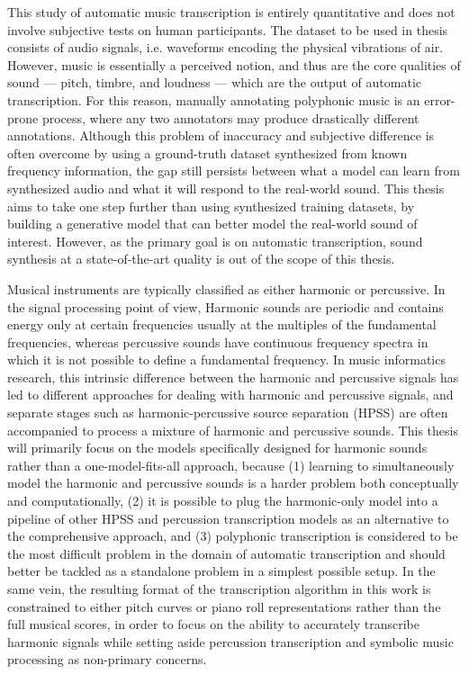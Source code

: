 This study of automatic music transcription is entirely quantitative and does not involve subjective tests on human participants.
The dataset to be used in thesis consists of audio signals, i.e. waveforms encoding the physical vibrations of air.
However, music is essentially a perceived notion, and thus are the core qualities of sound --- pitch, timbre, and loudness --- which are the output of automatic transcription.
For this reason, manually annotating polyphonic music is an error-prone process, where any two annotators may produce drastically different annotations.
Although this problem of inaccuracy and subjective difference is often overcome by using a ground-truth dataset synthesized from known frequency information, the gap still persists between what a model can learn from synthesized audio and what it will respond to the real-world sound.
This thesis aims to take one step further than using synthesized training datasets, by building a generative model that can better model the real-world sound of interest.
However, as the primary goal is on automatic transcription, sound synthesis at a state-of-the-art quality is out of the scope of this thesis.


Musical instruments are typically classified as either harmonic or percussive.
In the signal processing point of view, Harmonic sounds are periodic and contains energy only at certain frequencies usually at the multiples of the fundamental frequencies, whereas percussive sounds have continuous frequency spectra in which it is not possible to define a fundamental frequency.
In music informatics research, this intrinsic difference between the harmonic and percussive signals has led to different approaches for dealing with harmonic and percussive signals, and separate stages such as harmonic-percussive source separation (HPSS) are often accompanied to process a mixture of harmonic and percussive sounds.
This thesis will primarily focus on the models specifically designed for harmonic sounds rather than a one-model-fits-all approach, because (1) learning to simultaneously model the harmonic and percussive sounds is a harder problem both conceptually and computationally, (2) it is possible to plug the harmonic-only model into a pipeline of other HPSS and percussion transcription models as an alternative to the comprehensive approach, and (3) polyphonic transcription is considered to be the most difficult problem in the domain of automatic transcription and should better be tackled as a standalone problem in a simplest possible setup.
In the same vein, the resulting format of the transcription algorithm in this work is constrained to either pitch curves or piano roll representations rather than the full musical scores, in order to focus on the ability to accurately transcribe harmonic signals while setting aside percussion transcription and symbolic music processing as non-primary concerns.


